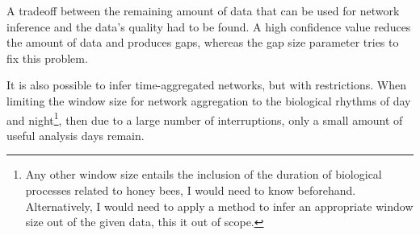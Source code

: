 A tradeoff between the remaining amount of data that can be used for network inference and the data's quality had to be found. A high confidence value reduces the amount of data and produces gaps, whereas the gap size parameter tries to fix this problem. 

It is also possible to infer time-aggregated networks, but with restrictions.
When limiting the window size for network aggregation to the biological rhythms of day and night\footnote{Any other window size entails the inclusion of the duration of biological processes related to honey bees, I would need to know beforehand. Alternatively, I would need to apply a method to infer an appropriate window size out of the given data, this it out of scope.}, then due to a large number of interruptions, only a small amount of useful analysis days remain.